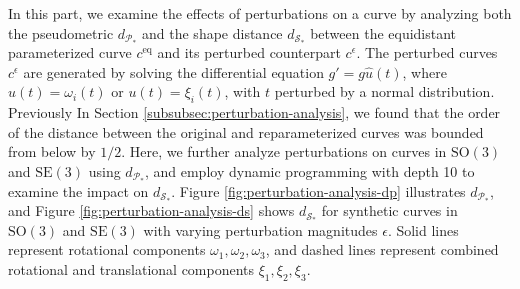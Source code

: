 In this part, we examine the effects of perturbations on a curve by analyzing both the pseudometric \(d_{\mathcal{P}_*}\) and the shape distance \(d_{\mathcal{S}_*}\) between the equidistant parameterized curve \(c^{\text{eq}}\) and its perturbed counterpart \(c^\epsilon\). The perturbed curves \(c^\epsilon\) are generated by solving the differential equation \(g' = g \hat{u}(t)\), where \(u(t) = \omega_i(t)\) or \(u(t) = \xi_i(t)\), with \(t\) perturbed by a normal distribution.
Previously In Section \ref{subsubsec:perturbation-analysis}, we found that the order of the distance between the original and reparameterized curves was bounded from below by \(1/2\). Here, we further analyze perturbations on curves in \(\mathrm{SO}(3)\) and \(\mathrm{SE}(3)\) using \(d_{\mathcal{P}_*}\), and employ dynamic programming with depth 10 to examine the impact on \(d_{\mathcal{S}_*}\). Figure \ref{fig:perturbation-analysis-dp} illustrates \(d_{\mathcal{P}_*}\), and Figure \ref{fig:perturbation-analysis-ds} shows \(d_{\mathcal{S}_*}\) for synthetic curves in \(\mathrm{SO}(3)\) and \(\mathrm{SE}(3)\) with varying perturbation magnitudes \(\epsilon\). Solid lines represent rotational components \(\omega_1, \omega_2, \omega_3\), and dashed lines represent combined rotational and translational components \(\xi_1, \xi_2, \xi_3\).

